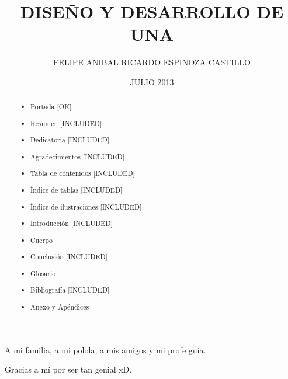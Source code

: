 \documentclass[upright, contnum]{umemoria}
\author{FELIPE ANIBAL RICARDO ESPINOZA CASTILLO}
\title{DISEÑO Y DESARROLLO DE UNA}
\date{JULIO 2013}
\begin{document}
\frontmatter
\maketitle

\begin{abstract}
  \begin{itemize}
    \item Portada [OK]
    \item Resumen [INCLUDED]
    \item Dedicatoria [INCLUDED]
    \item Agradecimientos [INCLUDED]
    \item Tabla de contenidos [INCLUDED]
    \item Índice de tablas [INCLUDED]
    \item Índice de ilustraciones [INCLUDED]
  \end{itemize}

  \begin{itemize}
    \item Introducción [INCLUDED]
    \item Cuerpo
    \item Conclusión [INCLUDED]
  \end{itemize}

  \begin{itemize}
    \item Glosario
    \item Bibliografía [INCLUDED]
    \item Anexo y Apéndices
  \end{itemize}
\end{abstract}

\begin{dedicatoria}
  A mi familia, a mi polola, a mis amigos y mi profe guía.
\end{dedicatoria}

\begin{thanks}
  Gracias a mí por ser tan genial xD.
\end{thanks}

\tableofcontents

\listoftables

\listoffigures

\mainmatter


% 



\nocite{*}


\end{document}
